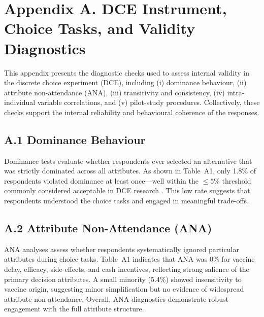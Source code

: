 \appendix
\section*{Appendix A. DCE Instrument, Choice Tasks, and Validity Diagnostics}

This appendix presents the diagnostic checks used to assess internal validity in the discrete 
choice experiment (DCE), including (i) dominance behaviour, (ii) attribute non-attendance 
(ANA), (iii) transitivity and consistency, (iv) intra-individual variable correlations, and 
(v) pilot-study procedures. Collectively, these checks support the internal reliability and 
behavioural coherence of the responses.

\subsection*{A.1 Dominance Behaviour}

Dominance tests evaluate whether respondents ever selected an alternative that was strictly 
dominated across all attributes. As shown in Table~A1, only 1.8\% of respondents violated 
dominance at least once—well within the $\leq 5\%$ threshold commonly considered acceptable 
in DCE research \cite{Louviere2000,Johnson2013}. This low rate suggests that respondents 
understood the choice tasks and engaged in meaningful trade-offs.

\subsection*{A.2 Attribute Non-Attendance (ANA)}

ANA analyses assess whether respondents systematically ignored particular attributes during 
choice tasks. Table~A1 indicates that ANA was 0\% for vaccine delay, efficacy, side-effects, 
and cash incentives, reflecting strong salience of the primary decision attributes. A small 
minority (5.4\%) showed insensitivity to vaccine origin, suggesting minor simplification but 
no evidence of widespread attribute non-attendance. Overall, ANA diagnostics demonstrate 
robust engagement with the full attribute structure.


